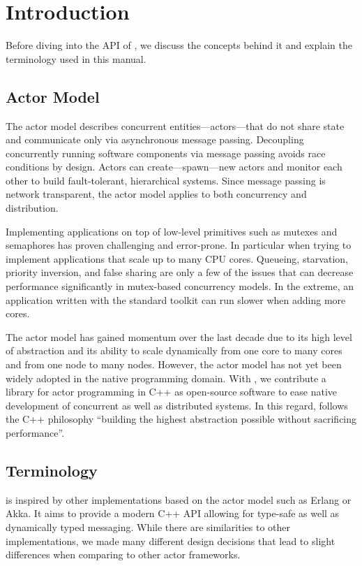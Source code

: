 \section{Introduction}

Before diving into the API of \lib, we discuss the concepts behind it and
explain the terminology used in this manual.

\subsection{Actor Model}

The actor model describes concurrent entities---actors---that do not share
state and communicate only via asynchronous message passing. Decoupling
concurrently running software components via message passing avoids race
conditions by design. Actors can create---spawn---new actors and monitor each
other to build fault-tolerant, hierarchical systems. Since message passing is
network transparent, the actor model applies to both concurrency and
distribution.

Implementing applications on top of low-level primitives such as mutexes and
semaphores has proven challenging and error-prone. In particular when trying to
implement applications that scale up to many CPU cores. Queueing, starvation,
priority inversion, and false sharing are only a few of the issues that can
decrease performance significantly in mutex-based concurrency models. In the
extreme, an application written with the standard toolkit can run slower when
adding more cores.

The actor model has gained momentum over the last decade due to its high level
of abstraction and its ability to scale dynamically from one core to many cores
and from one node to many nodes. However, the actor model has not yet been
widely adopted in the native programming domain. With \lib, we contribute a
library for actor programming in C++ as open-source software to ease native
development of concurrent as well as distributed systems. In this regard, \lib
follows the C++ philosophy ``building the highest abstraction possible without
sacrificing performance''.

\subsection{Terminology}

\lib is inspired by other implementations based on the actor model such as
Erlang or Akka. It aims to provide a modern C++ API allowing for type-safe as
well as dynamically typed messaging. While there are similarities to other
implementations, we made many different design decisions that lead to slight
differences when comparing \lib to other actor frameworks.

